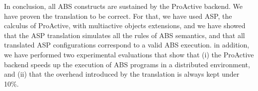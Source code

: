 In conclusion, all ABS constructs are sustained by the ProActive backend. We have proven the translation to be correct. For that, we have used ASP, the calculus of ProActive, with multiactive objects extensions, and we have showed that the ASP translation simulates all the rules of ABS semantics, and that all translated ASP configurations correspond to a valid ABS execution. in addition, we have performed two experimental evaluations that show that (i) the ProActive backend speeds up the execution of ABS programs in a distributed environment, and (ii) that the overhead introduced by the translation is always kept under 10\%.
